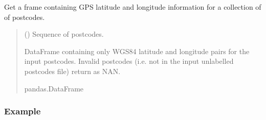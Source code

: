 \documentclass[letterpaper,10pt,english]{sphinxmanual}
\begin{document}
\begin{fulllineitems}
\begin{fulllineitems}
\begin{quote}
\begin{description}
\end{description}\end{quote}

\end{fulllineitems}


\begin{fulllineitems}
\label{\detokenize{index:flood_tool.Tool.get_lat_long}}
\pysigstartsignatures
{}
\pysigstopsignatures
\sphinxAtStartPar
Get a frame containing GPS latitude and longitude information for a
collection of of postcodes.
\begin{quote}\begin{description}
\sphinxAtStartPar
{} () \textendash{} Sequence of postcodes.

\sphinxAtStartPar
DataFrame containing only WGS84 latitude and longitude pairs for
the input postcodes. Invalid postcodes (i.e. not in the
input unlabelled postcodes file) return as NAN.

\sphinxAtStartPar
pandas.DataFrame

\end{description}\end{quote}
\subsubsection*{Example}

\begin{sphinxVerbatim}[commandchars=\\\{\}]
\PYG{p}{[} \PYG{p}{]}
\end{sphinxVerbatim}

\begin{sphinxVerbatim}[commandchars=\\\{\}]
\PYG{p}{[} \PYG{p}{]}
\end{sphinxVerbatim}


\end{fulllineitems}
\end{fulllineitems}
\end{document}
